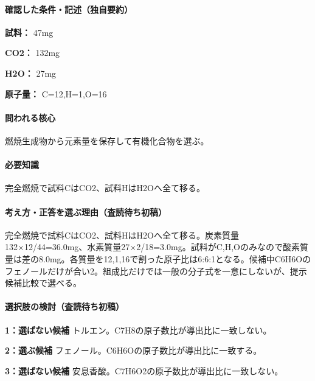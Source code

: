 \paragraph{確認した条件・記述（独自要約）}\mbox{}\par

\noindent\textbf{試料：} 47mg\par

\noindent\textbf{CO2：} 132mg\par

\noindent\textbf{H2O：} 27mg\par

\noindent\textbf{原子量：} C=\allowbreak{}12,H=\allowbreak{}1,O=\allowbreak{}16\par

\paragraph{問われる核心} 燃焼生成物から元素量を保存して有機化合物を選ぶ。

\paragraph{必要知識} 完全燃焼で試料CはCO2、試料HはH2Oへ全て移る。

\paragraph{考え方・正答を選ぶ理由（査読待ち初稿）} 完全燃焼で試料CはCO2、試料HはH2Oへ全て移る。炭素質量132×12/44=\allowbreak{}36.0mg、水素質量27×2/18=\allowbreak{}3.0mg。試料がC,H,Oのみなので酸素質量は差の8.0mg。各質量を12,1,16で割った原子比は6:6:1となる。候補中C6H6Oのフェノールだけが合い2。組成比だけでは一般の分子式を一意にしないが、提示候補比較で選べる。

\paragraph{選択肢の検討（査読待ち初稿）}\mbox{}\par

\noindent\textbf{1：選ばない候補} トルエン。C7H8の原子数比が導出比に一致しない。\par

\noindent\textbf{2：選ぶ候補} フェノール。C6H6Oの原子数比が導出比に一致する。\par

\noindent\textbf{3：選ばない候補} 安息香酸。C7H6O2の原子数比が導出比に一致しない。\par

